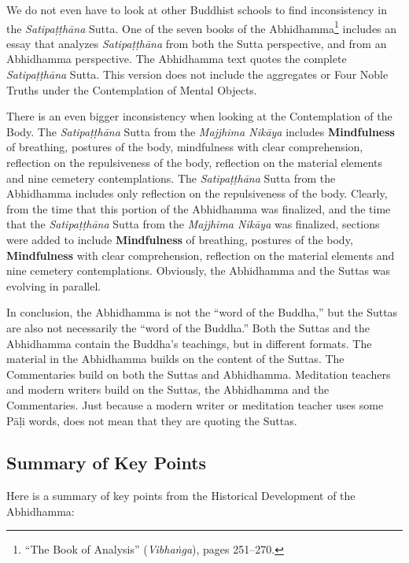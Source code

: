 We do not even have to look at other Buddhist schools to find inconsistency in the \textit{Satipaṭṭhāna} Sutta. One of the seven books of the Abhidhamma\footnote{“The Book of Analysis” (\textit{Vibhaṅga}), pages 251--270.} includes an essay that analyzes \textit{Satipaṭṭhāna} from both the Sutta perspective, and from an Abhidhamma perspective. The Abhidhamma text quotes the complete \textit{Satipaṭṭhāna} Sutta. This version does not include the aggregates or Four Noble Truths under the Contemplation of Mental Objects.

There is an even bigger inconsistency when looking at the Contemplation of the Body. The \textit{Satipaṭṭhāna} Sutta from the \textit{Majjhima Nikāya} includes \textbf{Mindfulness} of breathing, postures of the body, mindfulness with clear comprehension, reflection on the repulsiveness of the body, reflection on the material elements and nine cemetery contemplations. The \textit{Satipaṭṭhāna} Sutta from the Abhidhamma includes only reflection on the repulsiveness of the body. Clearly, from the time that this portion of the Abhidhamma was finalized, and the time that the \textit{Satipaṭṭhāna} Sutta from the \textit{Majjhima Nikāya} was finalized, sections were added to include \textbf{Mindfulness} of breathing, postures of the body, \textbf{Mindfulness} with clear comprehension, reflection on the material elements and nine cemetery contemplations. Obviously, the Abhidhamma and the Suttas was evolving in parallel.

In conclusion, the Abhidhamma is not the “word of the Buddha,” but the Suttas are also not necessarily the “word of the Buddha.” Both the Suttas and the Abhidhamma contain the Buddha’s teachings, but in different formats. The material in the Abhidhamma builds on the content of the Suttas. The Commentaries build on both the Suttas and Abhidhamma. Meditation teachers and modern writers build on the Suttas, the Abhidhamma and the Commentaries. Just because a modern writer or meditation teacher uses some Pāḷi words, does not mean that they are quoting the Suttas.

\subsection*{Summary of Key Points}

Here is a summary of key points from the Historical Development of the Abhidhamma:

